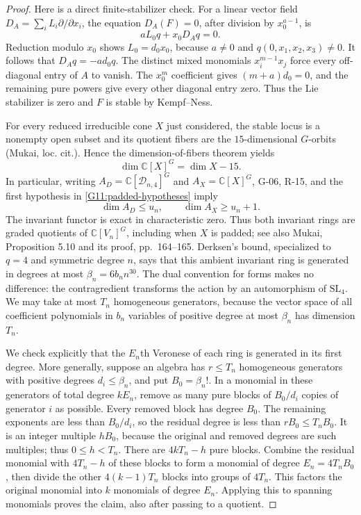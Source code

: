 \begin{proof}
Here is a direct finite-stabilizer check. For a linear vector
field $D_A=\sum_i L_i\partial/\partial x_i$, the equation
$D_A(F)=0$, after division by $x_0^{a-1}$, is
\[
 aL_0q+x_0D_Aq=0.
\]
Reduction modulo $x_0$ shows $L_0=d_0x_0$, because $a\ne0$
and $q(0,x_1,x_2,x_3)\ne0$. It follows that
$D_Aq=-ad_0q$. The distinct mixed monomials
$x_i^{m-1}x_j$ force every off-diagonal entry of $A$ to
vanish. The $x_0^m$ coefficient gives $(m+a)d_0=0$,
and the remaining pure powers give every other diagonal
entry zero. Thus the Lie stabilizer is zero and $F$ is
stable by Kempf--Ness.

For every reduced irreducible cone $X$ just considered,
the stable locus is a nonempty open subset and its quotient
fibers are the $15$-dimensional $G$-orbits (Mukai, loc. cit.).
Hence the dimension-of-fibers theorem yields
\begin{equation}\label{G11:quotient-dimension}
 \dim\mathbb C[X]^G=\dim X-15.
\end{equation}
In particular, writing $A_D=\mathbb C[\mathcal D_{n,4}]^G$
and $A_X=\mathbb C[X]^G$, G-06, R-15, and the first
hypothesis in \eqref{G11:padded-hypotheses} imply
\[
 \dim A_D\leq u_n,\qquad \dim A_X\geq u_n+1.
\]
The invariant functor is exact in characteristic zero.
Thus both invariant rings are graded quotients of
$\mathbb C[V_n]^G$, including when $X$ is padded; see also
Mukai, Proposition 5.10 and its proof, pp.~164--165.
Derksen's bound, specialized to $q=4$ and symmetric degree
$n$, says that this ambient invariant ring is generated in
degrees at most $\beta_n=6b_n n^{30}$. The dual convention
for forms makes no difference: the contragredient
transforms the action by an automorphism of $\mathrm{SL}_4$.
We may take at most $T_n$ homogeneous generators, because
the vector space of all coefficient polynomials in $b_n$
variables of positive degree at most $\beta_n$ has dimension
$T_n$.

We check explicitly that the $E_n$th Veronese of each ring
is generated in its first degree. More generally, suppose
an algebra has $r\leq T_n$ homogeneous generators with
positive degrees $d_i\leq\beta_n$, and put
$B_0=\beta_n!$. In a monomial in these generators of total
degree $kE_n$, remove as many pure blocks of
$B_0/d_i$ copies of generator $i$ as possible. Every removed
block has degree $B_0$. The remaining exponents are less
than $B_0/d_i$, so the residual degree is less than
$rB_0\leq T_n B_0$. It is an integer multiple $hB_0$,
because the original and removed degrees are such multiples;
thus $0\leq h<T_n$. There are $4kT_n-h$ pure blocks.
Combine the residual monomial with $4T_n-h$ of these blocks
to form a monomial of degree $E_n=4T_nB_0$, then divide
the other $4(k-1)T_n$ blocks into groups of $4T_n$.
This factors the original monomial into $k$ monomials of
degree $E_n$. Applying this to spanning monomials proves
the claim, also after passing to a quotient.


\end{proof}
